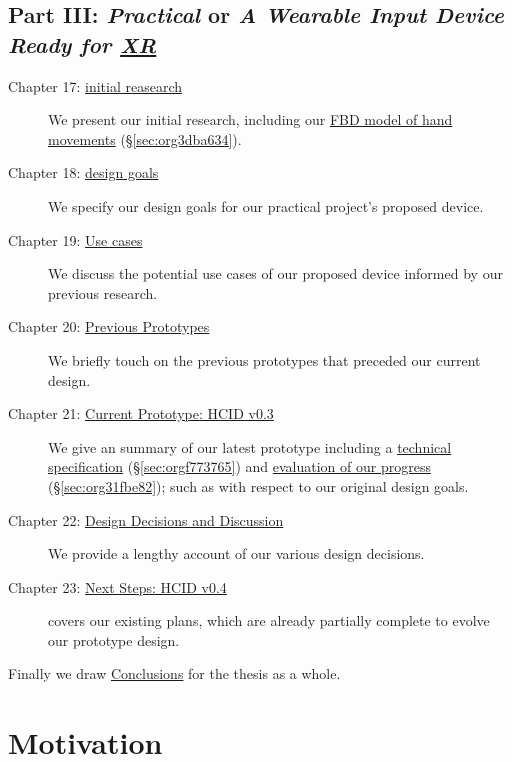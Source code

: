 \documentclass[logo,bsc,singlespacing,parskip]{infthesis}
\begin{document}
\section*{Part III: \emph{Practical} or \emph{A Wearable Input Device Ready for \hyperref[org1d567af]{XR}}}
\label{sec:orgd5e59c3}
\begin{description}
\item[{Chapter 17: \hyperref[sec:orgbd5ab1b]{initial reasearch}}] We present our initial research, including our \hyperref[sec:org3dba634]{FBD model of hand movements} (\S \ref{sec:org3dba634}).

\item[{Chapter 18: \hyperref[sec:orgbde43e9]{design goals}}] We specify our design goals for our practical project's proposed device.

\item[{Chapter 19:  \hyperref[sec:org967c85c]{Use cases}}] We discuss the potential use cases of our proposed  device  informed by our previous research.

\item[{Chapter 20: \hyperref[sec:org5a3f7ca]{Previous Prototypes}}] We briefly touch on the previous prototypes that preceded our current design.

\item[{Chapter 21: \hyperref[sec:orgd7e9134]{Current Prototype: HCID v0.3}}] We give an summary of our latest prototype including a \hyperref[sec:orgf773765]{technical specification} (\S \ref{sec:orgf773765}) and \hyperref[sec:org31fbe82]{evaluation of our progress} (\S \ref{sec:org31fbe82}); such as with respect to our original design goals.

\item[{Chapter 22: \hyperref[sec:org9a7c67c]{Design Decisions and Discussion}}] We provide a lengthy account of our various design decisions.

\item[{Chapter 23:  \hyperref[sec:org1833e95]{Next Steps: HCID v0.4}}] covers our existing plans, which are already partially complete to evolve our prototype design.
\end{description}

Finally we draw \hyperref[sec:orgea2fe85]{Conclusions} for the thesis as a whole.

\chapter*{Motivation}
\label{sec:org03cebe2}
\end{document}
